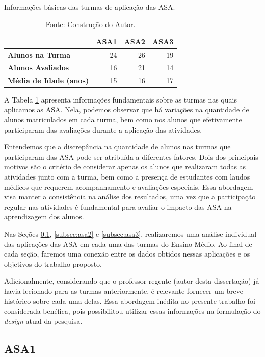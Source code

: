 \begin{table}[ht]
\centering
\caption{Informações básicas das turmas de aplicação das ASA.}
\label{tab:basicoASA}
\begin{tabular}{p{5cm}rrr}
\toprule
& \textbf{ASA1} & \textbf{ASA2} & \textbf{ASA3} \\
\midrule
\textbf{Alunos na Turma} & 24 & 26 & 19 \\
\textbf{Alunos Avaliados} & 16 & 21 & 14 \\
\textbf{Média de Idade (anos)} & 15 & 16 & 17 \\
\bottomrule
\end{tabular}
\caption*{Fonte: Construção do Autor.}
\end{table}

A Tabela \ref{tab:basicoASA} apresenta informações fundamentais sobre as turmas nas quais aplicamos as ASA. Nela, podemos observar que há variações na quantidade de alunos matriculados em cada turma, bem como nos alunos que efetivamente participaram das avaliações durante a aplicação das atividades. 

Entendemos que a discrepância na quantidade de alunos nas turmas que participaram das ASA pode ser atribuída a diferentes fatores. Dois dos principais motivos são o critério de considerar apenas os alunos que realizaram todas as atividades junto com a turma, bem como a presença de estudantes com laudos médicos que requerem acompanhamento e avaliações especiais. Essa abordagem visa manter a consistência na análise dos resultados, uma vez que a participação regular nas atividades é fundamental para avaliar o impacto das ASA na aprendizagem dos alunos.

Nas Seções \ref{subsec:asa1}, \ref{subsec:asa2} e \ref{subsec:asa3}, realizaremos uma análise individual das aplicações das ASA em cada uma das turmas do Ensino Médio. Ao final de cada seção, faremos uma conexão entre os dados obtidos nessas aplicações e os objetivos do trabalho proposto.

Adicionalmente, considerando que o professor regente (autor desta dissertação) já havia lecionado para as turmas anteriormente, é relevante fornecer um breve histórico sobre cada uma delas. Essa abordagem inédita no presente trabalho foi considerada benéfica, pois possibilitou utilizar essas informações na formulação do \textit{design} atual da pesquisa.

\subsection{ASA1} \label{subsec:asa1}

